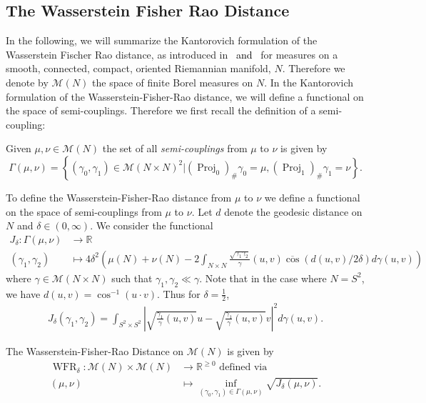 \documentclass[final,hidelinks,onefignum,onetabnum]{siamart220329}
\newcommand{\R}{\mathbb{R}}
\newcommand{\WFR}{\operatorname{WFR}}
\begin{document}
\subsection{The Wasserstein Fisher Rao Distance}
In the following, we will summarize the Kantorovich formulation of the Wasserstein Fischer Rao distance, as introduced in~\cite{chizat2018unbalanced} \textcolor{black}{ and~\cite{kondratyev2016new}} for measures on a smooth, connected, compact, oriented Riemannian manifold, $N$. Therefore we denote by $\mathcal{M}(N)$ the space of finite Borel measures on $N$. In the Kantorovich formulation of the Wasserstein-Fisher-Rao distance, we will define a functional on the space of semi-couplings. Therefore we first recall the definition of a semi-coupling:
\begin{definition}
Given $\mu,\nu\in\mathcal{M}(N)$ the set of all \textit{semi-couplings} from $\mu$ to $\nu$ is given by
\begin{equation*}
    \Gamma(\mu,\nu)=\left\{ (\gamma_0,\gamma_1)\in \mathcal{M}(N\times N)^2| (\operatorname{Proj}_0)_\#\gamma_0=\mu,(\operatorname{Proj}_1)_\#\gamma_1=\nu\right\}.
\end{equation*}
\end{definition}  
\noindent To define the Wasserstein-Fisher-Rao distance from $\mu$ to $\nu$ we define a functional on the space of semi-couplings from $\mu$ to $\nu$.
Let $d$ denote the geodesic distance on $N$ and $\delta\in (0,\infty)$. We consider the functional 
\begin{align*}
    J_\delta:\Gamma(\mu,\nu)&\to \R\\
    (\gamma_1,\gamma_2)&\mapsto  4\delta^2\left(\mu(N)+\nu(N)-2\int_{N\times N}\frac{\sqrt{\gamma_1\gamma_2}}{\gamma}(u,v) \overline{\cos}(d(u,v)/2\delta) d\gamma(u,v)\right)
\end{align*}
where $\gamma\in\mathcal{M}(N \times N)$ such that $ \gamma_1,\gamma_2\ll\gamma $. Note that in the case where $N=S^2$, we have $d(u,v)=\cos^{-1}(u\cdot v)$. Thus for $\delta= \frac{1}{2}$,
\begin{align}
    J_\delta(\gamma_1,\gamma_2)=\int_{S^2\times S^2}\left|\sqrt{\frac{\gamma_1}{\gamma}(u,v)}u-\sqrt{\frac{\gamma_1}{\gamma}(u,v)}v\right|^2 d\gamma(u,v).
\end{align}
\begin{definition}
The Wasserstein-Fisher-Rao Distance on $\mathcal{M}(N)$ is given by 
\begin{align}
    \WFR_\delta:\mathcal{M}(N)\times\mathcal{M}(N)&\to\R^{\geq0} \text{ defined via }\\
    (\mu,\nu)&\mapsto \inf\limits_{(\gamma_0,\gamma_1)\in \Gamma(\mu,\nu)} \sqrt{J_\delta(\mu,\nu)}.
\end{align}
\end{definition}
\end{document}
